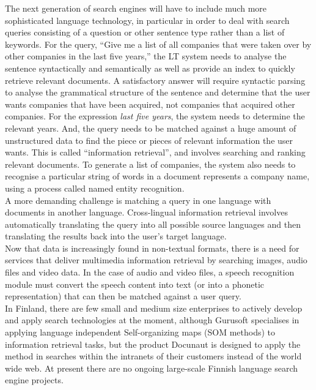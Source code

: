 \begin{multicols}{2}

The next generation of search engines will have to include much more
sophisticated language technology, in particular in order to deal with
search queries consisting of a question or other sentence type rather
than a list of keywords. For the query, “Give me a list of all
companies that were taken over by other companies in the last five
years,” the LT system needs to analyse the sentence syntactically and
semantically as well as provide an index to quickly retrieve relevant
documents. A satisfactory answer will require syntactic parsing to
analyse the grammatical structure of the sentence and determine that
the user wants companies that have been acquired, not companies that
acquired other companies. For the expression \textit{last five years},
the system needs to determine the relevant years. And, the query needs
to be matched against a huge amount of unstructured data to find the
piece or pieces of relevant information the user wants. This is called
“information retrieval”, and involves searching and ranking relevant
documents. To generate a list of companies, the system also needs to recognise a particular string of words in a document represents a company name, using a process called named entity recognition.\\
A more demanding challenge is matching a query in one language with
documents in another language. Cross-lingual information retrieval
involves automatically translating the query into all possible source
languages and then translating the results back into the user's target
language.\\
Now that data is increasingly found in non-textual formats, there is a
need for services that deliver multimedia information retrieval by
searching images, audio files and video data. In the case of audio and
video files, a speech recognition module must convert the speech
content into text (or into a phonetic representation) that can then be
matched against a user query.\\
In Finland, there are few small and medium size enterprises to actively develop and apply search
technologies at the moment, although Gurusoft specialises in applying
language independent Self-organizing maps (SOM methods) to information
retrieval tasks, but the product Docunaut is designed to apply the method in searches within the intranets of their customers instead of the world wide web. At present
there are no ongoing large-scale Finnish language search engine
projects.


\end{multicols}
